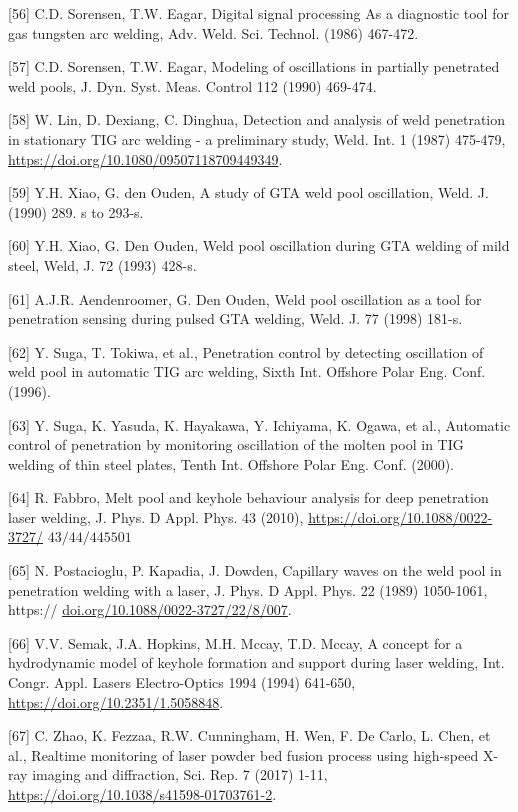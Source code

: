 \documentclass[10pt]{article}
\begin{document}
[56] C.D. Sorensen, T.W. Eagar, Digital signal processing As a diagnostic tool for gas tungsten arc welding, Adv. Weld. Sci. Technol. (1986) 467-472.

[57] C.D. Sorensen, T.W. Eagar, Modeling of oscillations in partially penetrated weld pools, J. Dyn. Syst. Meas. Control 112 (1990) 469-474.

[58] W. Lin, D. Dexiang, C. Dinghua, Detection and analysis of weld penetration in stationary TIG arc welding - a preliminary study, Weld. Int. 1 (1987) 475-479, \href{https://doi.org/10.1080/09507118709449349}{https://doi.org/10.1080/09507118709449349}.

[59] Y.H. Xiao, G. den Ouden, A study of GTA weld pool oscillation, Weld. J. (1990) 289. s to 293-s.

[60] Y.H. Xiao, G. Den Ouden, Weld pool oscillation during GTA welding of mild steel, Weld, J. 72 (1993) 428-s.

[61] A.J.R. Aendenroomer, G. Den Ouden, Weld pool oscillation as a tool for penetration sensing during pulsed GTA welding, Weld. J. 77 (1998) 181-s.

[62] Y. Suga, T. Tokiwa, et al., Penetration control by detecting oscillation of weld pool in automatic TIG arc welding, Sixth Int. Offshore Polar Eng. Conf. (1996).

[63] Y. Suga, K. Yasuda, K. Hayakawa, Y. Ichiyama, K. Ogawa, et al., Automatic control of penetration by monitoring oscillation of the molten pool in TIG welding of thin steel plates, Tenth Int. Offshore Polar Eng. Conf. (2000).

[64] R. Fabbro, Melt pool and keyhole behaviour analysis for deep penetration laser welding, J. Phys. D Appl. Phys. 43 (2010), \href{https://doi.org/10.1088/0022-3727/}{https://doi.org/10.1088/0022-3727/} $43 / 44 / 445501$

[65] N. Postacioglu, P. Kapadia, J. Dowden, Capillary waves on the weld pool in penetration welding with a laser, J. Phys. D Appl. Phys. 22 (1989) 1050-1061, https:// \href{http://doi.org/10.1088/0022-3727/22/8/007}{doi.org/10.1088/0022-3727/22/8/007}.

[66] V.V. Semak, J.A. Hopkins, M.H. Mccay, T.D. Mccay, A concept for a hydrodynamic model of keyhole formation and support during laser welding, Int. Congr. Appl. Lasers Electro-Optics 1994 (1994) 641-650, \href{https://doi.org/10.2351/1.5058848}{https://doi.org/10.2351/1.5058848}.

[67] C. Zhao, K. Fezzaa, R.W. Cunningham, H. Wen, F. De Carlo, L. Chen, et al., Realtime monitoring of laser powder bed fusion process using high-speed X-ray imaging and diffraction, Sci. Rep. 7 (2017) 1-11, \href{https://doi.org/10.1038/s41598-01703761-2}{https://doi.org/10.1038/s41598-01703761-2}.
\end{document}
